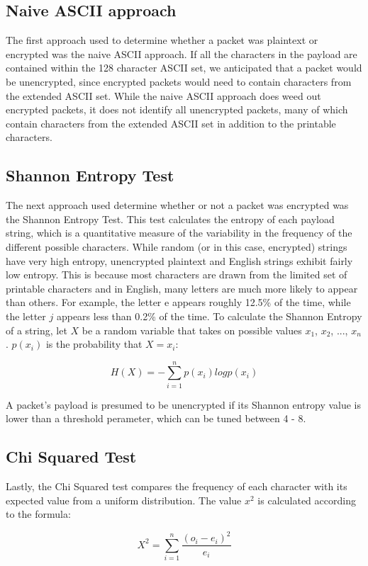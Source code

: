 \subsection{Naive ASCII approach}
The first approach used to determine whether a packet was plaintext or encrypted was the naive ASCII approach. If all the characters in the payload are contained within the 128 character ASCII set, we anticipated that a packet would be unencrypted, since encrypted packets would need to contain characters from the extended ASCII set. While the naive ASCII approach does weed out encrypted packets, it does not identify all unencrypted packets, many of which contain characters from the extended ASCII set in addition to the printable characters. 

\subsection{Shannon Entropy Test}
The next approach used determine whether or not a packet was encrypted was the Shannon Entropy Test. This test calculates the entropy of each payload string, which is a quantitative measure of the variability in the frequency of the different possible characters. While random (or in this case, encrypted) strings have very high entropy, unencrypted plaintext and English strings exhibit fairly low entropy. This is because most characters are drawn from the limited set of printable characters and in English, many letters are much more likely to appear than others. For example, the letter e appears roughly 12.5\% of the time, while the letter $j$ appears less than 0.2\% of the time. To calculate the Shannon Entropy of a string, let $X$ be a random variable that takes on possible values $x_1$, $x_2$, ..., $x_n$. $p(x_i)$ is the probability that $X = x_i$:

$$H(X) = - \sum_{i = 1}^{n} p(x_i) log p(x_i)$$

A packet's payload is presumed to be unencrypted if its Shannon entropy value is lower than a threshold perameter, which can be tuned between 4 - 8. 

\subsection{Chi Squared Test}
Lastly, the Chi Squared test compares the frequency of each character with its expected value from a uniform distribution. The value $x^2$ is calculated according to the formula:

$$X^2 = \sum_{i=1}^{n} \frac{(o_i-e_i)^2}{e_i}$$

